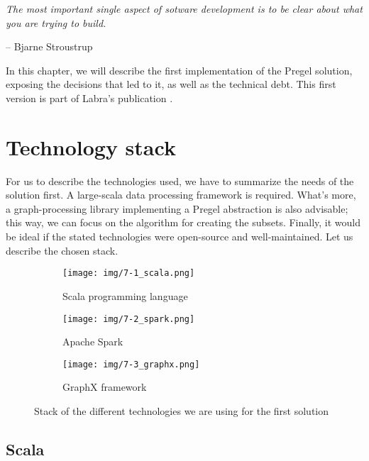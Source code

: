 \epigraph{\textit{The most important single aspect of sotware development is to be clear about what you are trying to build.}}{-- \textup{Bjarne Stroustrup}}

In this chapter, we will describe the first implementation of the Pregel solution, exposing the decisions that led to it, as well as the technical debt. This first version is part of Labra's publication \cite{https://doi.org/10.48550/arxiv.2110.11709}.

\section{Technology stack}

For us to describe the technologies used, we have to summarize the needs of the solution first. A large-scala data processing framework is required. What's more, a graph-processing library implementing a Pregel abstraction is also advisable; this way, we can focus on the algorithm for creating the subsets. Finally, it would be ideal if the stated technologies were open-source and well-maintained. Let us describe the chosen stack.

\begin{figure}[ht]
    \begin{subfigure}{.3\textwidth}
        \centering
        \texttt{[image: img/7-1\_scala.png]}
        \caption{Scala programming language}
    \end{subfigure}%
    \hspace*{0.5em}
    \begin{subfigure}{.3\textwidth}
        \centering
        \texttt{[image: img/7-2\_spark.png]}
        \caption{Apache Spark}
    \end{subfigure}%
    \hspace*{0.5em}
    \begin{subfigure}{.3\textwidth}
        \centering
        \texttt{[image: img/7-3\_graphx.png]}
        \caption{GraphX framework}
    \end{subfigure}%
    \caption{Stack of the different technologies we are using for the first solution}
\end{figure}

\subsection{Scala}



